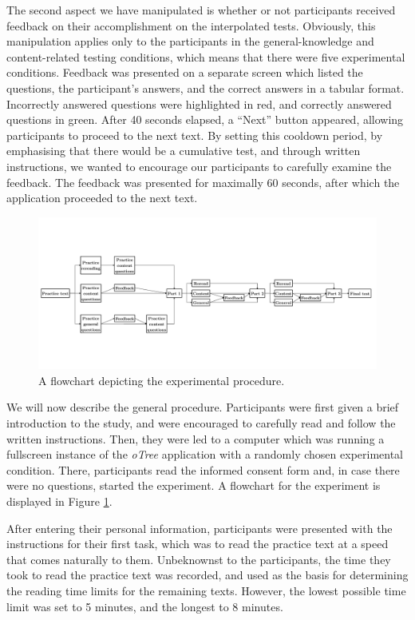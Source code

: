 \documentclass[../main.tex]{subfiles}
\begin{document}
The second aspect we have manipulated is whether or not participants
received feedback on their accomplishment on the interpolated tests.
Obviously, this manipulation applies only to the participants in the
general-knowledge and content-related testing conditions, which means
that there were five experimental conditions. Feedback was presented on
a separate screen which listed the questions, the participant's answers,
and the correct answers in a tabular format. Incorrectly answered
questions were highlighted in red, and correctly answered questions in
green. After 40 seconds elapsed, a ``Next'' button appeared, allowing
participants to proceed to the next text. By setting this cooldown
period, by emphasising that there would be a cumulative test, and
through written instructions, we wanted to encourage our participants to
carefully examine the feedback. The feedback was presented for maximally
60 seconds, after which the application proceeded to the next text.

\begin{figure}[p]
  \centering
  \includegraphics[width = 1.3\textwidth, keepaspectratio, angle = 90, trim = 0 0 0 0]{images/procedure.pdf}
  \caption{A flowchart depicting the experimental procedure.}
  \label{flowchart}
\end{figure}

We will now describe the general procedure. Participants were first
given a brief introduction to the study, and were encouraged to
carefully read and follow the written instructions. Then, they were led
to a computer which was running a fullscreen instance of the
\textit{oTree} application with a randomly chosen experimental
condition. There, participants read the informed consent form and, in
case there were no questions, started the experiment. A flowchart for
the experiment is displayed in Figure \ref{flowchart}.

After entering their personal information, participants were presented
with the instructions for their first task, which was to read the
practice text at a speed that comes naturally to them. Unbeknownst to
the participants, the time they took to read the practice text was
recorded, and used as the basis for determining the reading time limits
for the remaining texts. However, the lowest possible time limit was set
to 5 minutes, and the longest to 8 minutes.
\end{document}
